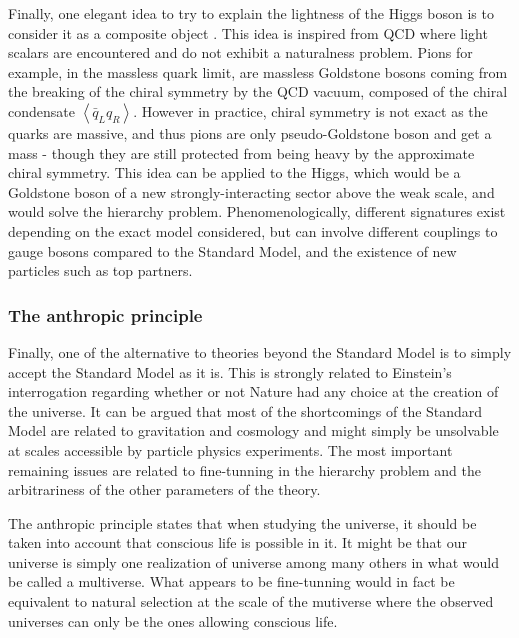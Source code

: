         Finally, one elegant idea to try to explain the lightness of the Higgs boson is to
        consider it as a composite object \cite{LittleHiggs, CompositeHiggs}. This idea is
        inspired from QCD where light scalars are encountered and do not exhibit a naturalness
        problem. Pions for example, in the massless quark limit, are massless Goldstone
        bosons coming from the breaking of the chiral symmetry by the QCD vacuum, composed
        of the chiral condensate $\left<\bar{q}_L q_R\right>$. However in practice,
        chiral symmetry is not exact as the quarks are massive, and thus pions are only
        pseudo-Goldstone boson and get a mass - though they are still protected from being
        heavy by the approximate chiral symmetry. This idea can be applied to the Higgs,
        which would be a Goldstone boson of a new strongly-interacting sector above the
        weak scale, and would solve the hierarchy problem. Phenomenologically, different
        signatures exist depending on the exact model considered, but can involve different
        couplings to gauge bosons compared to the Standard Model, and the existence of new
        particles such as top partners.

            \subsubsection{The anthropic principle}


        Finally, one of the alternative to theories beyond the Standard Model is to
        simply accept the Standard Model as it is. This is strongly related to Einstein's
        interrogation regarding whether or not Nature had any choice at the creation of
        the universe. It can be argued that most of the shortcomings of the Standard Model
        are related to gravitation and cosmology and might simply be unsolvable at scales accessible
        by particle physics experiments. The most important remaining issues are related to
        fine-tunning in the hierarchy problem and the arbitrariness of the other parameters
        of the theory.

        The anthropic principle states that when studying the universe, it
        should be taken into account that conscious life is possible in it. It might be
        that our universe is simply one realization of universe among many others in what
        would be called a multiverse. What appears to be fine-tunning would in fact be
        equivalent to natural selection at the scale of the mutiverse where the observed
        universes can only be the ones allowing conscious life.

